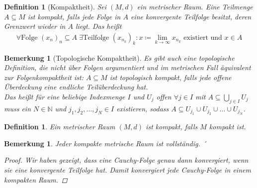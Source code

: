 \documentclass[11pt, twoside, a4paper]{article}
\theoremstyle{plain}
\newtheorem{bemerkung}[blockelement]{Bemerkung}
\newtheorem{definition}[blockelement]{Definition}
\numberwithin{equation}{subsection}
\newcommand{\pair}[1]{\left(#1\right)}
\newcommand{\fromto}{\rightarrow{}}
\newcommand{\toinf}{\fromto\infty}
\newcommand{\ex}{\;\exists}
\newcommand{\N}{\mathbb{N}}
\begin{document}
    \begin{definition}[Kompaktheit]
        Sei $\pair{M, d}$ ein metrischer Raum. Eine Teilmenge $A\subseteq M$ ist kompakt, falls jede Folge in $A$ eine konvergente Teilfolge besitzt, deren Grenzwert wieder in $A$ liegt. Das heißt
        \begin{align*}
            \forall \text{Folge } (x_n)_n\subseteq A\ex\text{Teilfolge } (x_{n_k})_k\colon x\coloneqq \lim_{k\toinf} x_{n_k}\text{ existiert und }x\in A
        \end{align*}
    \end{definition}

    \begin{bemerkung}[Topologische Kompaktheit]
        Es gibt auch eine topologische Definition, die nicht über Folgen argumentiert und im metrischen Fall äquivalent zur Folgenkompaktheit ist: $A\subseteq M$ ist topologisch kompakt, falls jede offene Überdeckung eine endliche Teilüberdeckung hat.\\
        Das heißt für eine beliebige Indexmenge $I$ und $U_j$ offen $\forall j\in I$ mit $A\subseteq \bigcup_{j\in I} U_j$ muss ein $N\in\N$ und $j_1, j_2, \ldots, j_N \in I$ existieren, sodass $A \subseteq U_{j_1} \cup U_{j_2} \cup \dots \cup U_{j_N}$.
    \end{bemerkung}

    \begin{definition}
        Ein metrischer Raum $\pair{M, d}$ ist kompakt, falls $M$ kompakt ist.
    \end{definition}

    \begin{bemerkung}
        Jeder kompakte metrische Raum ist vollständig.
        ´\begin{proof}
             Wir haben gezeigt, dass eine Cauchy-Folge genau dann konvergiert, wenn sie eine konvergente Teilfolge hat. Damit konvergiert jede Cauchy-Folge in einem kompakten Raum.
        \end{proof}
    \end{bemerkung}
\end{document}
